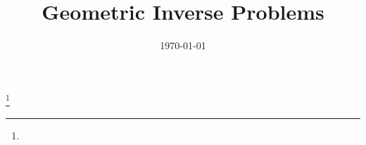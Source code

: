 \newcommand*{\bfrac}[2]{\genfrac{}{}{0pt}{}{#1}{#2}}

\title{Geometric Inverse Problems}
\author[Hashem A. Damrah]{}
\date{\today}

\def\subjclass{Primary 53C21; Secondary 35R30, 53C22}
\def\keywords{Riemannian manifolds, inverse problems, geodesics, metric rigidity, X-ray transform, boundary distance data.}
\def\subjclassname{}

\thanks{}

\newcommand\bs{Berry and Sauer~\cite{1606.02353}}
\newcommand\blfootnote[1]{%
  \begingroup
  \renewcommand\thefootnote{}\footnote{#1}%
  \addtocounter{footnote}{-1}%
  \endgroup
}

\newcommand\codv[3][]{\odv[style-inf-num=\mathrm{D},#1]{#2}{#3}}
